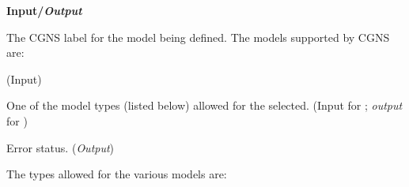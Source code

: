 \noindent
\textbf{\textcolor{input}{Input}/\textcolor{output}{\textit{Output}}}

\begin{Ventryi}{}\raggedright
\item [\fort{ModelLabel}]
      The CGNS label for the model being defined.
      The models supported by CGNS are:
      \begin{itemize*}
      \item {}
      \item {}
      \item {}
      \item {}
      \item {}
      \item {}
      \item {}
      \item {}
      \item {}
      \item {}
      \end{itemize*}
      (\textcolor{input}{Input})
\item [\fort{ModelType}]
      One of the model types (listed below) allowed for the
       selected.
      (\textcolor{input}{Input} for ;
      \textcolor{output}{\textit{output}} for )
\item [\fort{ier}]
      Error status.
      (\textcolor{output}{\textit{Output}})
\end{Ventryi}

\noindent
The types allowed for the various models are:

